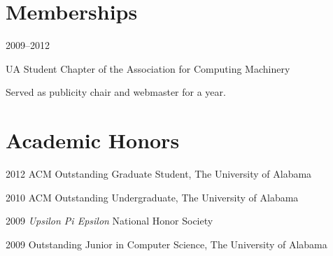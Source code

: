 \documentclass[11pt]{simplecv}
\begin{document}
\section{Memberships} 

\begin{topic}

\item[2009--2012] {
  UA Student Chapter of the Association for Computing Machinery
  
  Served as publicity chair and webmaster for a year.
}

\end{topic}


\section{Academic Honors} 
\begin{topic}
  \item [2012] { ACM Outstanding Graduate Student, The University of Alabama }
  \item [2010] { ACM Outstanding Undergraduate, The University of Alabama }
  \item [2009] { \textit{Upsilon Pi Epsilon} National Honor Society }
  \item [2009] { Outstanding Junior in Computer Science, The University of Alabama }
\end{topic}


\nocite{*}


\end{document}
